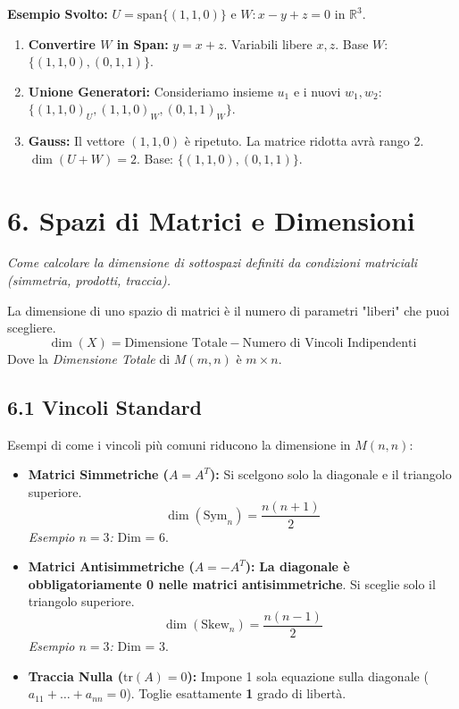 \documentclass[10pt,a4paper]{article}
\begin{document}
\medskip

\textbf{Esempio Svolto:}
$U = \text{span}\{ (1, 1, 0) \}$ e $W: x - y + z = 0$ in $\mathbb{R}^3$.

\begin{enumerate}
    \item \textbf{Convertire $W$ in Span:}
    $y = x + z$. Variabili libere $x, z$.
    Base $W$: $\{ (1,1,0), (0,1,1) \}$.
    
    \item \textbf{Unione Generatori:}
    Consideriamo insieme $u_1$ e i nuovi $w_1, w_2$:
    $\{ (1,1,0)_U, (1,1,0)_W, (0,1,1)_W \}$.
    
    \item \textbf{Gauss:}
    Il vettore $(1,1,0)$ è ripetuto. La matrice ridotta avrà rango 2.
    \\ $\dim(U+W) = 2$. Base: $\{(1,1,0), (0,1,1)\}$.
\end{enumerate}

\section*{6. Spazi di Matrici e Dimensioni}
\textit{Come calcolare la dimensione di sottospazi definiti da condizioni matriciali (simmetria, prodotti, traccia).}

\begin{tcolorbox}[colback=purple!5!white,colframe=purple!75!black,title=\textbf{Gradi di Libertà}]
La dimensione di uno spazio di matrici è il numero di parametri "liberi" che puoi scegliere.
\[ \dim(X) = \text{Dimensione Totale} - \text{Numero di Vincoli Indipendenti} \]
Dove la \textit{Dimensione Totale} di $M(m,n)$ è $m \times n$.
\end{tcolorbox}

\subsection*{6.1 Vincoli Standard}
Esempi di come i vincoli più comuni riducono la dimensione in $M(n,n)$:

\begin{itemize}
    \item \textbf{Matrici Simmetriche ($A=A^T$):}
    Si scelgono solo la diagonale e il triangolo superiore.
    \[ \dim(\text{Sym}_n) = \frac{n(n+1)}{2} \]
    \textit{Esempio $n=3$:} Dim = 6.
    
    \item \textbf{Matrici Antisimmetriche ($A=-A^T$):}
    \textbf{La diagonale è obbligatoriamente 0 nelle matrici antisimmetriche}. Si sceglie solo il triangolo superiore.
    \[ \dim(\text{Skew}_n) = \frac{n(n-1)}{2} \]
    \textit{Esempio $n=3$:} Dim = 3.
    
    \item \textbf{Traccia Nulla ($\text{tr}(A)=0$):}
    Impone 1 sola equazione sulla diagonale ($a_{11} + \dots + a_{nn} = 0$).
    Toglie esattamente \textbf{1} grado di libertà.
\end{itemize}
\end{document}

